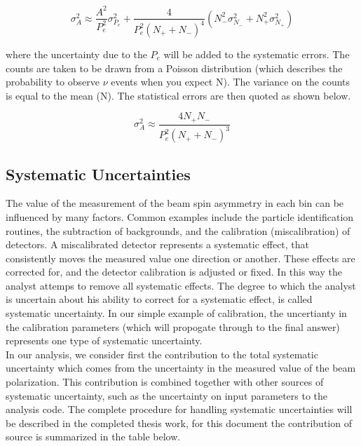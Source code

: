\begin{equation}
  \sigma_A^2 \approx \frac{A^2}{P_e^2} \sigma_{P_e}^2 + \frac{4}{P_e^2 (N_+ + N_-)^4}(N_-^2 \sigma_{N_-}^2 + N_+^2 \sigma_{N_+}^2) 
\end{equation}

where the uncertainty due to the $P_e$ will be added to the systematic errors.  The counts are taken to be drawn from a Poisson distribution (which describes the probability to observe $\nu$ events when you expect N).  The variance on the counts is equal to the mean (N).  The statistical errors are then quoted as shown below. 

\begin{equation}
  \sigma_A^2 \approx \frac{4N_+N_-}{P_e^2 (N_+ + N_-)^3} 
\end{equation}

\subsection{Systematic Uncertainties}

The value of the measurement of the beam spin asymmetry in each bin can be influenced by many factors.  Common examples include the particle identification routines, the subtraction of backgrounds, and the calibration (miscalibration) of detectors.  A miscalibrated detector represents a systematic effect, that consistently moves the measured value one direction or another.  These effects are corrected for, and the detector calibration is adjusted or fixed.  In this way the analyst attemps to remove all systematic effects.  The degree to which the analyst is uncertain about his ability to correct for a systematic effect, is called systematic uncertainty.  In our simple example of calibration, the uncertianty in the calibration parameters (which will propogate through to the final answer) represents one type of systematic uncertainty. \\

In our analysis, we consider first the contribution to the total systematic uncertainty which comes from the uncertainty in the measured value of the beam polarization.  This contribution is combined together with other sources of systematic uncertainty, such as the uncertainty on input parameters to the analysis code.  The complete procedure for handling systematic uncertainties will be described in the completed thesis work, for this document the contribution of source is summarized in the table below. 

%
%

